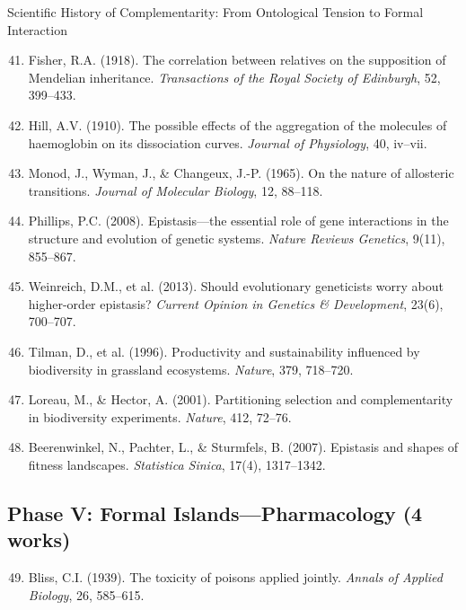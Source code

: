 \begin{chapter}{Scientific History of Complementarity: From Ontological Tension to Formal Interaction}
\begin{enumerate}
    \setcounter{enumi}{40}
    \item Fisher, R.A. (1918). The correlation between relatives on the supposition of Mendelian inheritance. \textit{Transactions of the Royal Society of Edinburgh}, 52, 399--433.

    \item Hill, A.V. (1910). The possible effects of the aggregation of the molecules of haemoglobin on its dissociation curves. \textit{Journal of Physiology}, 40, iv--vii.

    \item Monod, J., Wyman, J., \& Changeux, J.-P. (1965). On the nature of allosteric transitions. \textit{Journal of Molecular Biology}, 12, 88--118.

    \item Phillips, P.C. (2008). Epistasis---the essential role of gene interactions in the structure and evolution of genetic systems. \textit{Nature Reviews Genetics}, 9(11), 855--867.

    \item Weinreich, D.M., et al. (2013). Should evolutionary geneticists worry about higher-order epistasis? \textit{Current Opinion in Genetics \& Development}, 23(6), 700--707.

    \item Tilman, D., et al. (1996). Productivity and sustainability influenced by biodiversity in grassland ecosystems. \textit{Nature}, 379, 718--720.

    \item Loreau, M., \& Hector, A. (2001). Partitioning selection and complementarity in biodiversity experiments. \textit{Nature}, 412, 72--76.

    \item Beerenwinkel, N., Pachter, L., \& Sturmfels, B. (2007). Epistasis and shapes of fitness landscapes. \textit{Statistica Sinica}, 17(4), 1317--1342.
\end{enumerate}

\subsection{Phase V: Formal Islands---Pharmacology (4 works)}

\begin{enumerate}
    \setcounter{enumi}{48}
    \item Bliss, C.I. (1939). The toxicity of poisons applied jointly. \textit{Annals of Applied Biology}, 26, 585--615.


\end{enumerate}
\end{chapter}
